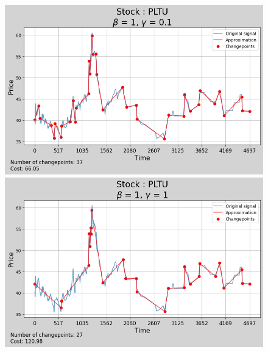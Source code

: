 \documentclass[11pt]{article}
\begin{document}
\begin{figure}[H]
    \centering
    \begin{minipage}[t]{0.42\textwidth}
        \includegraphics[width=\textwidth]{figures/results/scale_analysis_beta_1_stock_PLTU/scale_0.1.png}
    \end{minipage}
    \begin{minipage}[t]{0.42\textwidth}
        \includegraphics[width=\textwidth]{figures/results/scale_analysis_beta_1_stock_PLTU/scale_1.png}
    \end{minipage}


\end{figure}
\end{document}
